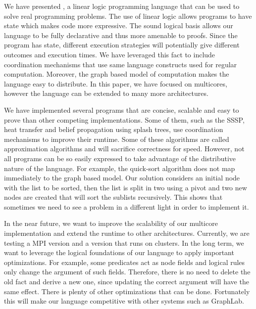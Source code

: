 
We have presented \lang, a linear logic programming language that can be used to solve real programming problems.
The use of linear logic allows programs to have state which makes code more expressive.
The sound logical basis allows our language to be fully declarative and thus more amenable to proofs.
Since the program has state, different execution strategies will potentially give different outcomes and execution times. We have
leveraged this fact to include coordination mechanisms that use same language constructs used for regular computation.
Moreover, the graph based model of computation makes the language easy to distribute. In this paper, we have
focused on multicores, however the language can be extended to many more architectures.

We have implemented several programs that are concise, scalable and easy to prove than other competing implementations. Some of them, such as
the SSSP, heat transfer and belief propagation using splash trees, use coordination mechanisms to improve their runtime. Some of these algorithms
are called approximation algorithms and will sacrifice correctness for speed. However, not all programs can be so easily expressed
to take advantage of the distributive nature of the language. For example, the quick-sort
algorithm does not map immediately to the graph based model. Our solution considers an initial node with the list to be
sorted, then the list is split in two using a pivot and two new nodes are created that will sort the sublists recursively. This shows that
sometimes we need to see a problem in a different light in order to implement it.

In the near future, we want to improve the scalability of our multicore implementation and extend the runtime to other architectures. Currently,
we are testing a MPI version and a version that runs on clusters. In the long term, we want to leverage the logical foundations of our language
to apply important optimizations. For example, some predicates act as node fields and logical rules only change the argument of such fields.
Therefore, there is no need to delete the old fact and derive a new one, since updating the correct argument will have the same effect.
There is plenty of other optimizations that can be done. Fortunately this will make our language competitive with other systems such as GraphLab.